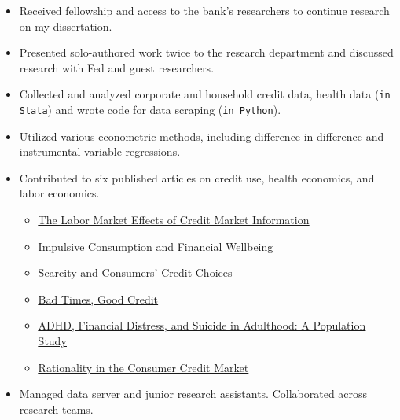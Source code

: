 \documentclass{clean_CV}
\begin{document}
\medskip



\begin{itemize}
    \item Received fellowship and access to the bank's researchers to continue research on my dissertation.
    \item Presented solo-authored work twice to the research department and discussed research with Fed and guest researchers.
\end{itemize}


\medskip


\begin{itemize}
    \item Collected and analyzed corporate and household credit data, health data (\texttt{in Stata}) and wrote code for data scraping (\texttt{in Python}).
    \item Utilized various econometric methods, including difference-in-difference and instrumental variable regressions.
    \item Contributed to six published articles on credit use, health economics, and labor economics.
    \begin{itemize}
        \item \uline{\href{https://academic.oup.com/rfs/article/31/6/2005/4822045}{The Labor Market Effects of Credit Market Information}}
        \item \uline{\href{https://academic.oup.com/rfs/article/34/5/2608/5893490}{Impulsive Consumption and Financial Wellbeing}}
        \item \uline{\href{https://link.springer.com/article/10.1007/s11238-021-09815-2}{Scarcity and Consumers' Credit Choices}}
        \item \uline{\href{https://onlinelibrary.wiley.com/doi/10.1111/jmcb.12736}{Bad Times, Good Credit}}
        \item \uline{\href{https://www.science.org/doi/full/10.1126/sciadv.aba1551}{ADHD, Financial Distress, and Suicide in Adulthood: A Population Study}}
        \item \uline{\href{https://www.sciencedirect.com/science/article/pii/B9780128135242000056}{Rationality in the Consumer Credit Market}}
    \end{itemize}
    \item Managed data server and junior research assistants. Collaborated across research teams.
\end{itemize}
\end{document}
